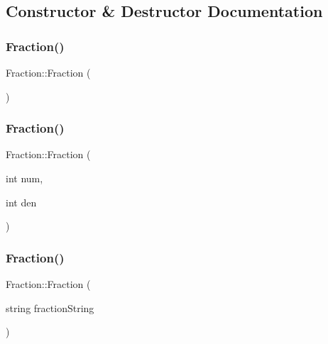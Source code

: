 \subsection{Constructor \& Destructor Documentation}
\hypertarget{class_fraction_a29efaf0ef03cceab0bfa637e9eea2b7b}{}\label{class_fraction_a29efaf0ef03cceab0bfa637e9eea2b7b} 
\subsubsection{\texorpdfstring{Fraction()}{Fraction()}\hspace{0.1cm}{\footnotesize\ttfamily [1/3]}}
{\footnotesize\ttfamily Fraction\+::\+Fraction (\begin{DoxyParamCaption}{ }\end{DoxyParamCaption})}

\hypertarget{class_fraction_a55b666fe7b94b74f21d4919d9110805d}{}\label{class_fraction_a55b666fe7b94b74f21d4919d9110805d} 
\subsubsection{\texorpdfstring{Fraction()}{Fraction()}\hspace{0.1cm}{\footnotesize\ttfamily [2/3]}}
{\footnotesize\ttfamily Fraction\+::\+Fraction (\begin{DoxyParamCaption}\item[{int}]{num,  }\item[{int}]{den }\end{DoxyParamCaption})}

\hypertarget{class_fraction_a679e4834d2576a2b96a2904a81e5d990}{}\label{class_fraction_a679e4834d2576a2b96a2904a81e5d990} 
\subsubsection{\texorpdfstring{Fraction()}{Fraction()}\hspace{0.1cm}{\footnotesize\ttfamily [3/3]}}
{\footnotesize\ttfamily Fraction\+::\+Fraction (\begin{DoxyParamCaption}\item[{string}]{fraction\+String }\end{DoxyParamCaption})}



